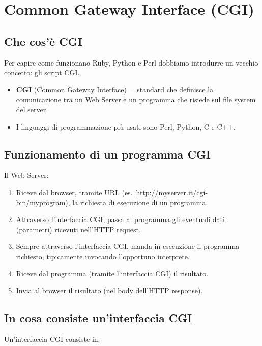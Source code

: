 \section{Common Gateway Interface (CGI)}

\subsection{Che cos'è CGI}

Per capire come funzionano Ruby, Python e Perl dobbiamo introdurre un vecchio concetto: gli script CGI.

\begin{itemize}
    \item \textbf{CGI} (Common Gateway Interface) = standard che definisce la comunicazione tra un Web Server e un programma che risiede sul file system del server.
    \item I linguaggi di programmazione più usati sono Perl, Python, C e C++.
\end{itemize}

\subsection{Funzionamento di un programma CGI}

Il Web Server:

\begin{enumerate}
    \item Riceve dal browser, tramite URL (es.\ \url{http://myserver.it/cgi-bin/myprogram}), la richiesta di esecuzione di un programma.
    \item Attraverso l'interfaccia CGI, passa al programma gli eventuali dati (parametri) ricevuti nell'HTTP request.
    \item Sempre attraverso l'interfaccia CGI, manda in esecuzione il programma richiesto, tipicamente invocando l'opportuno interprete.
    \item Riceve dal programma (tramite l'interfaccia CGI) il risultato.
    \item Invia al browser il risultato (nel body dell'HTTP response).
\end{enumerate}

\subsection{In cosa consiste un'interfaccia CGI}

Un'interfaccia CGI consiste in:

